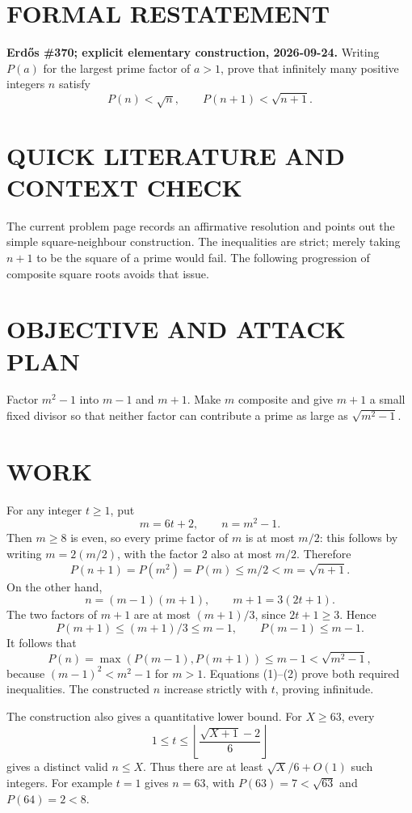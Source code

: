 \section{FORMAL RESTATEMENT}
\textbf{Erd\H{o}s \#370; explicit elementary construction, 2026-09-24.}
Writing $P(a)$ for the largest prime factor of $a>1$, prove that infinitely many positive integers $n$ satisfy
\[
P(n)<\sqrt n,\qquad P(n+1)<\sqrt{n+1}.
\]

\section{QUICK LITERATURE AND CONTEXT CHECK}
The current problem page records an affirmative resolution and points out the simple square-neighbour construction. The inequalities are strict; merely taking $n+1$ to be the square of a prime would fail. The following progression of composite square roots avoids that issue.

\section{OBJECTIVE AND ATTACK PLAN}
Factor $m^2-1$ into $m-1$ and $m+1$. Make $m$ composite and give $m+1$ a small fixed divisor so that neither factor can contribute a prime as large as $\sqrt{m^2-1}$.

\section{WORK}
For any integer $t\geq1$, put
\[
m=6t+2,\qquad n=m^2-1.
\]
Then $m\geq8$ is even, so every prime factor of $m$ is at most $m/2$: this follows by writing $m=2(m/2)$, with the factor $2$ also at most $m/2$. Therefore
\[
P(n+1)=P(m^2)=P(m)\leq m/2<m=\sqrt{n+1}.                 \tag{1}
\]
On the other hand,
\[
n=(m-1)(m+1),\qquad m+1=3(2t+1).
\]
The two factors of $m+1$ are at most $(m+1)/3$, since $2t+1\geq3$. Hence
\[
P(m+1)\leq(m+1)/3\leq m-1,
\qquad P(m-1)\leq m-1.
\]
It follows that
\[
P(n)=\max(P(m-1),P(m+1))\leq m-1<\sqrt{m^2-1},          \tag{2}
\]
because $(m-1)^2<m^2-1$ for $m>1$. Equations (1)--(2) prove both required inequalities. The constructed $n$ increase strictly with $t$, proving infinitude.

The construction also gives a quantitative lower bound. For $X\geq63$, every
\[
1\leq t\leq\left\lfloor\frac{\sqrt{X+1}-2}{6}\right\rfloor
\]
gives a distinct valid $n\leq X$. Thus there are at least $\sqrt X/6+O(1)$ such integers. For example $t=1$ gives $n=63$, with $P(63)=7<\sqrt{63}$ and $P(64)=2<8$.

